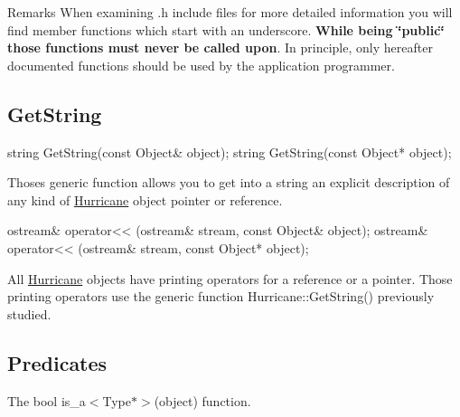 \begin{DoxyRemark}{Remarks}
When examining {\ttfamily }.h include files for more detailed information you will find member functions which start with an underscore. {\bfseries While being \char`\"{}public\char`\"{} those functions must never be called upon}. In principle, only here\textquotesingle{}after documented functions should be used by the application programmer.
\end{DoxyRemark}
\hypertarget{group__Generalities_secGeneralitiesGetString}{}\subsection{Get\+String}\label{group__Generalities_secGeneralitiesGetString}

\begin{DoxyCode}
\textcolor{keywordtype}{string} GetString(\textcolor{keyword}{const} Object& \textcolor{keywordtype}{object});
\textcolor{keywordtype}{string} GetString(\textcolor{keyword}{const} Object* \textcolor{keywordtype}{object});
\end{DoxyCode}
 Thoses generic function allows you to get into a string an explicit description of any kind of \mbox{\hyperlink{namespaceHurricane}{Hurricane}} object pointer or reference. 
\begin{DoxyCode}
ostream& operator<< (ostream& stream, \textcolor{keyword}{const} Object& \textcolor{keywordtype}{object});
ostream& operator<< (ostream& stream, \textcolor{keyword}{const} Object* \textcolor{keywordtype}{object});
\end{DoxyCode}
 All \mbox{\hyperlink{namespaceHurricane}{Hurricane}} objects have printing operators for a reference or a pointer. Those printing operators use the generic function Hurricane\+::\+Get\+String() previously studied.\hypertarget{group__Generalities_secGeneralitiesPredicates}{}\subsection{Predicates}\label{group__Generalities_secGeneralitiesPredicates}
The {\ttfamily bool} {\ttfamily is\+\_\+a$<$\+Type$\ast$$>$(object)} function.

